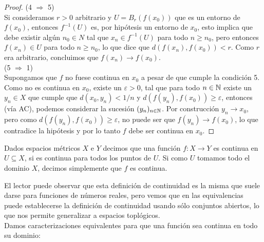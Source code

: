 \documentclass[12pt,a4paper]{book}
\begin{document}
\begin{teo}
\begin{proof}
(4 $\Rightarrow$ 5)\\
Si consideramos $r>0$ arbitrario y $U=B_r(f(x_0))$ que es un entorno de $f(x_0)$, entonces $f^{-1}(U)$ es, por hipótesis un entorno de $x_0$, esto implica que debe existir algún $n_0 \in N$ tal que $x_n \in f^{-1}(U)$ para todo $n \geq n_0$, pero entonces $f(x_n) \in U$ para todo $n \geq n_0$, lo que dice que $d(f(x_n),f(x_0)) < r$. Como $r$ era arbitrario, concluimos que $f(x_n) \rightarrow f(x_0)$.\\
(5 $\Rightarrow$ 1)\\
Supongamos que $f$ no fuese continua en $x_0$ a pesar de que cumple la condición 5. Como no es continua en $x_0$, existe un $\varepsilon >0$, tal que para todo $n \in \mathbb{N}$ existe un $y_n \in X$ que cumple que $d(x_0,y_n)<1/n$ y $d(f(y_n),f(x_0))\geq \varepsilon$, entonces (vía AC), podemos considerar la sucesión $(y_n)_{{n} \in \mathbb{N}}$. Por construcción $y_n \rightarrow x_0$, pero como $d(f(y_n),f(x_0))\geq \varepsilon$, no puede ser que $f(y_n) \rightarrow f(x_0)$, lo que contradice la hipótesis y por lo tanto $f$ debe ser continua en $x_0$.
\end{proof}
\end{teo}
\begin{defi}
Dados espacios métricos $X$ e $Y$ decimos que una función $f:X \rightarrow Y$ es continua en $U \subseteq X$, si es continua para todos los puntos de $U$. Si como $U$ tomamos todo el dominio $X$, decimos simplemente que $f$ es continua.
\end{defi}
El lector puede observar que esta definición de continuidad es la misma que suele darse para funciones de números reales, pero vemos que en las equivalencias puede establecerse la definición de continuidad usando sólo conjuntos abiertos, lo que nos permite generalizar a espacios toplógicos.\\
Damos caracterizaciones equivalentes para que una función sea continua en todo su dominio:
\end{document}
